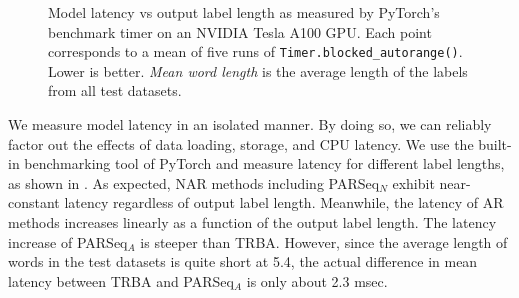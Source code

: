 \begin{figure}[htbp]
  \centering


  \caption[Model latency vs output label length.]{Model latency vs output label length as measured by PyTorch's benchmark timer on an NVIDIA Tesla A100 GPU. Each point corresponds to a mean of five runs of \texttt{Timer.blocked\_autorange()}. Lower is better. \textit{Mean word length} is the average length of the labels from all test datasets.}
  \label{fig:runtime}
\end{figure}

We measure model latency in an isolated manner. By doing so, we can reliably factor out the effects of data loading, storage, and CPU latency. We use the built-in benchmarking tool of PyTorch and measure latency for different label lengths, as shown in . As expected, NAR methods including PARSeq$_N$ exhibit near-constant latency regardless of output label length. Meanwhile, the latency of AR methods increases linearly as a function of the output label length. The latency increase of PARSeq$_A$ is steeper than TRBA. However, since the average length of words in the test datasets is quite short at 5.4, the actual difference in mean latency between TRBA and PARSeq$_A$ is only about 2.3 msec.


